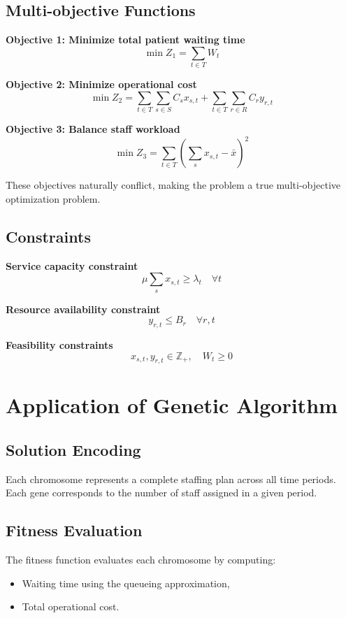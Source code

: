 \documentclass[12pt,a4paper]{article}
\begin{document}
	\subsection{Multi-objective Functions}
	
	\textbf{Objective 1: Minimize total patient waiting time}
	\[
	\min Z_1 = \sum_{t \in T} W_t
	\]
	
	\textbf{Objective 2: Minimize operational cost}
	\[
	\min Z_2 = \sum_{t \in T} \sum_{s \in S} C_s x_{s,t}
	+ \sum_{t \in T} \sum_{r \in R} C_r y_{r,t}
	\]
	
	\textbf{Objective 3: Balance staff workload}
	\[
	\min Z_3 = \sum_{t \in T} \left(\sum_s x_{s,t} - \bar{x} \right)^2
	\]
	
	These objectives naturally conflict, making the problem a true multi-objective optimization problem.
	
	\subsection{Constraints}
	
	\textbf{Service capacity constraint}
	\[
	\mu \sum_s x_{s,t} \ge \lambda_t \quad \forall t
	\]
	
	\textbf{Resource availability constraint}
	\[
	y_{r,t} \le B_r \quad \forall r,t
	\]
	
	\textbf{Feasibility constraints}
	\[
	x_{s,t}, y_{r,t} \in \mathbb{Z}_+, \quad W_t \ge 0
	\]
	
	\section{Application of Genetic Algorithm}
	
	\subsection{Solution Encoding}
	
	Each chromosome represents a complete staffing plan across all time periods. Each gene corresponds to the number of staff assigned in a given period.
	
	\subsection{Fitness Evaluation}
	
	The fitness function evaluates each chromosome by computing:
	\begin{itemize}
		\item Waiting time using the queueing approximation,
		\item Total operational cost.
	\end{itemize}
	
\end{document}
